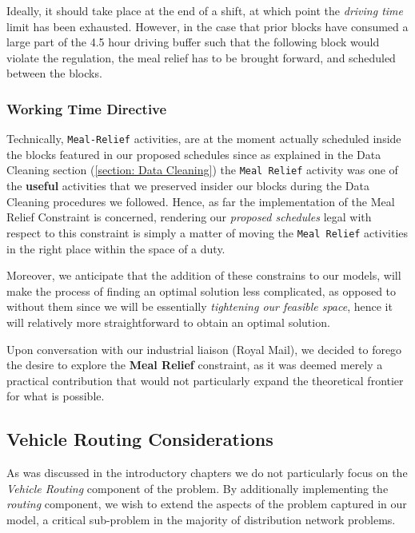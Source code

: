 \vspace{\baselineskip}
\noindent
Ideally, it should take place at the end of a shift, at which point the \textit{driving time} limit has been exhausted. However, in the case that prior blocks have consumed a large part of the 4.5 hour driving buffer such that the following block would violate the regulation, the meal relief has to be brought forward, and scheduled between the blocks.   

\subsubsection*{Working Time Directive}

 Technically, \texttt{Meal-Relief} activities, are at the moment actually scheduled inside the blocks featured in our proposed schedules since as explained in the Data Cleaning section (\ref{section: Data Cleaning}) the \texttt{Meal Relief} activity was one of the \textbf{useful} activities that we preserved insider our blocks during the Data Cleaning procedures we followed. Hence, as far the implementation of the Meal Relief Constraint is concerned, rendering our \textit{proposed schedules} legal with respect to this constraint is simply a matter of moving the \texttt{Meal Relief} activities in the right place within the space of a duty. 
 
 \vspace{\baselineskip}
\noindent
 Moreover, we anticipate that the addition of these constrains to our models, will make the process of finding an optimal solution less complicated, as opposed to without them since we will be essentially \textit{tightening our feasible space}, hence it will relatively more straightforward to obtain an optimal solution. 

\vspace{\baselineskip}
\noindent
Upon conversation with our industrial liaison (Royal Mail), we decided to forego the desire to explore the \textbf{Meal Relief} constraint, as it was deemed merely a practical contribution that would not particularly expand the theoretical frontier for what is possible. 

\subsection*{Vehicle Routing Considerations}
As was discussed in the introductory chapters we do not particularly focus on the \textit{Vehicle Routing} component of the problem. By additionally implementing the \textit{routing} component, we wish to extend the aspects of the problem captured in our model, a critical sub-problem in the majority of distribution network problems.


